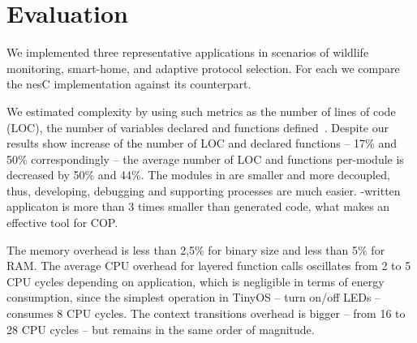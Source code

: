 \section{Evaluation}\label{sec:eval}

We implemented three representative applications in scenarios of wildlife
monitoring, smart-home, and adaptive protocol selection. For each we compare
the nesC implementation against its \conesc counterpart.

We estimated complexity by using such metrics as the number of lines of code
(LOC), the number of variables declared and functions defined~\cite{Pressman01}.
Despite our results show increase of the number of LOC and declared functions --
17\% and 50\% correspondingly -- the average number of LOC and functions
per-module is decreased by 50\% and 44\%. The modules in \conesc are smaller
and more decoupled, thus, developing, debugging and supporting processes are
much easier. \conesc-written applicaton is more than 3 times smaller than
generated code, what makes \conesc an effective tool for COP.

The memory overhead is less than 2,5\% for binary size and less than
5\% for RAM. The average CPU overhead for layered function calls oscillates
from 2 to 5 CPU cycles depending on application, which is negligible in terms of
energy consumption, since the simplest operation in TinyOS -- turn on/off LEDs
-- consumes 8 CPU cycles. The context transitions overhead is bigger -- from 16
to 28 CPU cycles -- but remains in the same order of magnitude.
